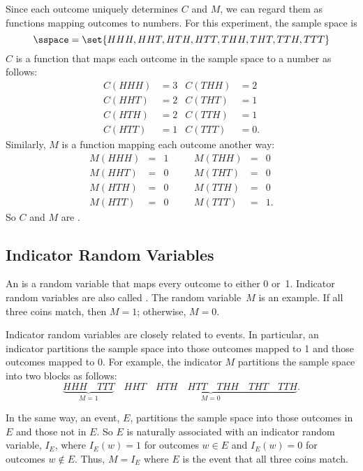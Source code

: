 Since each outcome uniquely determines $C$ and $M$, we can regard them
as functions mapping outcomes to numbers.  For this experiment, the
sample space is
\begin{equation*}
    \sspace = \set{ HHH, HHT, HTH, HTT, THH, THT, TTH, TTT }
\end{equation*}
$C$ is a function that maps each outcome in the sample space to a
number as follows:
\begin{align*}
C(HHH) & = 3 &  C(THH) & =  2 \\
C(HHT) & = 2 &  C(THT) & =  1 \\
C(HTH) & = 2 &  C(TTH) & =  1 \\
C(HTT) & = 1 &  C(TTT) & =  0.
\end{align*}
Similarly, $M$ is a function mapping each outcome another way:
\[
\begin{array}{rclcrcl}
M(HHH) & = & 1 & \quad & M(THH) & = & 0 \\
M(HHT) & = & 0 & \quad & M(THT) & = & 0 \\
M(HTH) & = & 0 & \quad & M(TTH) & = & 0 \\
M(HTT) & = & 0 & \quad & M(TTT) & = & 1.
\end{array}
\]
So $C$ and $M$ are .

\subsection{Indicator Random Variables}

An  is a random variable that maps
every outcome to either 0 or~1.  Indicator random variables are also
called .  The random variable~$M$ is an
example.  If all three coins match, then $M=1$; otherwise, $M = 0$.

Indicator random variables are closely related to events.  In
particular, an indicator partitions the sample space into those
outcomes mapped to 1 and those outcomes mapped to 0.  For example, the
indicator $M$ partitions the sample space into two blocks as follows:
\[
\underbrace{HHH \quad TTT}_{\text{$M = 1$}} \quad
\underbrace{HHT \quad HTH \quad HTT \quad
        THH \quad THT \quad TTH}_{\text{$M = 0$}}.
\]

In the same way, an event, $E$, partitions the sample space into those
outcomes in $E$ and those not in $E$.  So $E$ is naturally associated with
an indicator random variable, 
$I_E$, where $I_E(w) = 1$ for outcomes $w \in E$ and $I_E(w) = 0$ for
outcomes $w \notin E$.  Thus, $M=I_E$ where $E$ is the event that all
three coins match.


